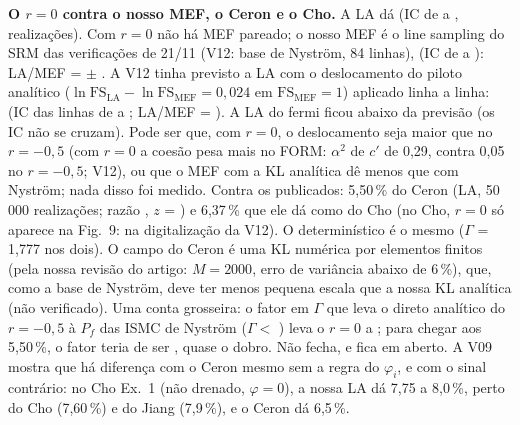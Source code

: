 \documentclass[11pt,a4paper]{article}
\begin{document}
\textbf{O $r = 0$ contra o nosso MEF, o Ceron e o Cho.} A LA dá \lmDirZPf{} (IC de \lmDirZLo{} a \lmDirZHi,
\lmDirZN{} realizações). Com $r = 0$ não há MEF pareado; o nosso MEF é o line sampling do SRM das verificações de 21/11
(V12: base de Nyström, 84 linhas), \lmZmef{} (IC de \lmZmefLo{} a \lmZmefHi): LA/MEF = \lmZrazMef{} $\pm$
\lmZrazMefErr. A V12 tinha previsto a LA com o deslocamento do piloto analítico ($\ln\mathrm{FS}_\text{LA} -
\ln\mathrm{FS}_\text{MEF} = 0{,}024$ em $\mathrm{FS}_\text{MEF} = 1$) aplicado linha a linha: \lmZprevV{} (IC das linhas
de \lmZprevVLo{} a \lmZprevVHi; LA/MEF = \lmZprevVraz). A LA do fermi ficou abaixo da previsão (os IC não se cruzam).
Pode ser que, com $r = 0$, o deslocamento seja maior que no $r = -0{,}5$ (com $r = 0$ a coesão pesa mais no FORM:
$\alpha^2$ de $c'$ de 0,29, contra 0,05 no $r = -0{,}5$; V12), ou que o MEF com a KL analítica dê menos que com
Nyström; nada disso foi medido. Contra
os publicados: 5,50\,\% do Ceron (LA, 50\,000 realizações; razão \lmZRazCeron, $z$ = \lmZz) e 6,37\,\% que ele dá como
do Cho (no Cho, $r = 0$ só aparece na Fig.~9: \lmZchoFig{} na digitalização da V12). O determinístico é o mesmo
($\Gamma$ = 1,777 nos dois). O campo do Ceron é uma KL numérica por elementos finitos (pela nossa revisão do artigo:
$M = 2000$, erro de variância abaixo de 6\,\%), que, como a base de Nyström, deve ter menos pequena escala que a nossa
KL analítica (não verificado). Uma conta grosseira: o fator em $\Gamma$ que leva o direto analítico do $r = -0{,}5$ à
$P_f$ das ISMC de Nyström ($\Gamma < $ \lmZfator) leva o $r = 0$ a \lmZprev; para chegar aos 5,50\,\%, o fator teria de
ser \lmZfatorCeron, quase o dobro. Não fecha, e fica em aberto. A V09 mostra que há diferença com o Ceron mesmo sem a
regra do $\varphi_i$, e com o sinal contrário: no Cho Ex.~1 (não drenado, $\varphi = 0$), a nossa LA dá 7,75 a 8,0\,\%,
perto do Cho (7,60\,\%) e do Jiang (7,9\,\%), e o Ceron dá 6,5\,\%.
\end{document}
